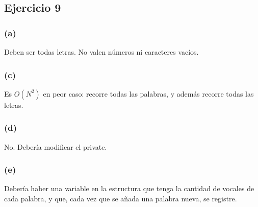 \documentclass[12 pt]{article}
\begin{document}
\subsection*{Ejercicio 9}
    \subsubsection*{(a)}
        Deben ser todas letras. No valen números ni caracteres vacíos.
    \subsubsection*{(c)}
        Es $O(N^{2})$ en peor caso: recorre todas las palabras, y además recorre todas las letras.
    \subsubsection*{(d)}
        No. Debería modificar el private.
    \subsubsection*{(e)}
        Debería haber una variable en la estructura que tenga la cantidad de vocales de cada palabra, y que, cada vez que se añada una palabra nueva, se registre.
\end{document}

